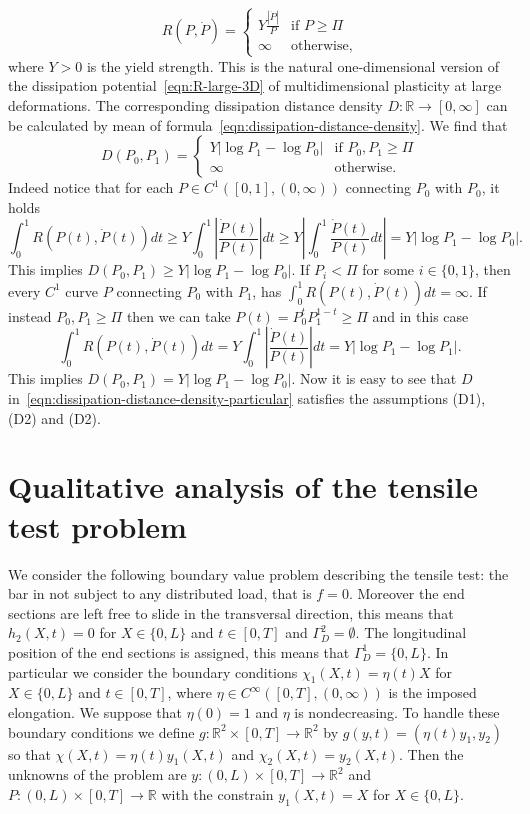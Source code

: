 \documentclass[a4paper,10pt,twoside]{amsbook}
\numberwithin{section}{chapter}
\numberwithin{equation}{chapter}
\theoremstyle{definition}
\begin{document}
\begin{equation}
R(P,\dot P)=
\begin{cases}
Y\frac{|\dot P|}{P} & \text{if $P\ge\Pi$} \\
\infty & \text{otherwise},
\end{cases}
\end{equation}
where $Y>0$ is the yield strength. This is the natural one-dimensional version of the dissipation potential~\eqref{eqn:R-large-3D} of multidimensional plasticity at large deformations. The corresponding dissipation distance density $D\colon\mathbb{R}\to[0,\infty]$ can be calculated by mean of formula~\eqref{eqn:dissipation-distance-density}. We find that
\begin{equation}
\label{eqn:dissipation-distance-density-particular}
D(P_0,P_1)=
\begin{cases}
Y|\log P_1-\log P_0| & \text{if $P_0,P_1\ge\Pi$} \\
\infty & \text{otherwise}.
\end{cases}
\end{equation}
Indeed notice that for each $P\in C^1([0,1],(0,\infty))$ connecting $P_0$ with $P_0$, it holds
\[
\int_0^1R(P(t),\dot{P}(t))dt\ge Y\int_0^1\left|\frac{\dot{P}(t)}{P(t)}\right|dt\ge Y\left|\int_0^1\frac{\dot{P}(t)}{P(t)}dt\right|=Y|\log P_1-\log P_0|.
\]
This implies $D(P_0,P_1)\ge Y|\log P_1-\log P_0|$. If $P_i<\Pi$ for some $i\in\{0,1\}$, then every $C^1$ curve $P$ connecting $P_0$ with $P_1$, has $\int_0^1R(P(t),\dot{P}(t))dt=\infty$. If instead $P_0,P_1\ge\Pi$ then we can take $P(t)=P_0^tP_1^{1-t}\ge\Pi$ and in this case
\[
\int_0^1R(P(t),\dot{P}(t))dt=Y\int_0^1\left|\frac{\dot{P}(t)}{P(t)}\right|dt=Y|\log P_1-\log P_1|.
\]
This implies $D(P_0,P_1)=Y|\log P_1-\log P_0|$. Now it is easy to see that $D$ in~\eqref{eqn:dissipation-distance-density-particular} satisfies the assumptions (D1), (D2) and (D2).

\section{Qualitative analysis of the tensile test problem}
\label{sec:qualitative}

We consider the following boundary value problem describing the tensile test: the bar in not subject to any distributed load, that is $f=0$. Moreover the end sections are left free to slide in the transversal direction, this means that $h_2(X,t)=0$ for $X\in\{0,L\}$ and $t\in[0,T]$ and $\Gamma_D^2=\emptyset$. The longitudinal position of the end sections is assigned, this means that $\Gamma_D^1=\{0,L\}$. In particular we consider the boundary conditions $\chi_1(X,t)=\eta(t)X$ for $X\in\{0,L\}$ and $t\in[0,T]$, where $\eta\in C^\infty([0,T],(0,\infty))$ is the imposed elongation. We suppose that $\eta(0)=1$ and $\eta$ is nondecreasing. To handle these boundary conditions we define $g\colon\mathbb{R}^2\times[0,T]\to\mathbb{R}^2$ by $g(y,t)=(\eta(t)y_1,y_2)$ so that $\chi(X,t)=\eta(t)y_1(X,t)$ and $\chi_2(X,t)=y_2(X,t)$. Then the unknowns of the problem are $y\colon(0,L)\times[0,T]\to\mathbb{R}^2$ and $P\colon(0,L)\times[0,T]\to\mathbb{R}$ with the constrain $y_1(X,t)=X$ for $X\in\{0,L\}$.
\end{document}
